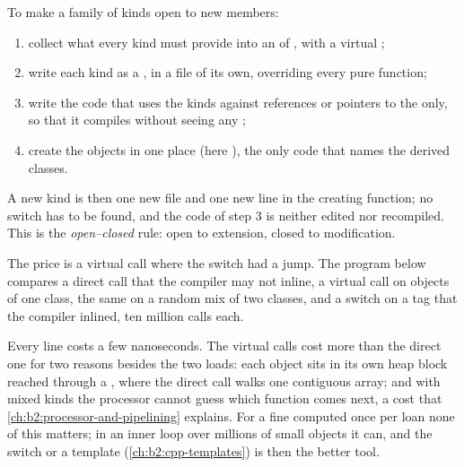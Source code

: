 \begin{method}\label{met:b2:cpp-polymorphism:open-closed}
To make a family of kinds open to new members:
\begin{enumerate}
\item collect what every kind must provide into an  of , with a virtual
;
\item write each kind as a , in a file of its own, overriding every pure function;
\item write the code that uses the kinds against references or pointers to the  only, so that it
compiles without seeing any ;
\item create the objects in one place (here ), the only code that names the derived classes.
\end{enumerate}
A new kind is then one new file and one new line in the creating function; no switch has to be found, and the code
of step 3 is neither edited nor recompiled. This is the \emph{open--closed} rule: open to extension, closed to
modification.
\end{method}

The price is a virtual call where the switch had a jump. The program below compares a direct call that the
compiler may not inline, a virtual call on objects of one class, the same on a random mix of two classes, and a
switch on a tag that the compiler inlined, ten million calls each.

\label{lst:b2:cpp-polymorphism:dispatch-cost}

\label{out:b2:cpp-polymorphism:dispatch-cost}

Every line costs a few nanoseconds. The virtual calls cost more than the direct one for two reasons besides the two
loads: each object sits in its own heap block reached through a , where the direct call walks one
contiguous array; and with mixed kinds the processor cannot guess which function comes next, a cost that
\cref{ch:b2:processor-and-pipelining} explains. For a fine computed once per loan none of this matters; in an inner
loop over millions of small objects it can, and the switch or a template (\cref{ch:b2:cpp-templates}) is then the
better tool.

